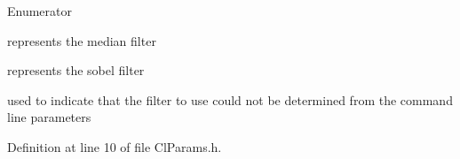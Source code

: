 \begin{Desc}
\item[Enumerator]\par
\begin{description}
\item[{\em 
\hypertarget{namespaceapp_1_1_filter_a2945c335b9c131d8983b181e876d7b00a8ac753cf25baff3e8f119fe1f4efb75b}{}Median\label{namespaceapp_1_1_filter_a2945c335b9c131d8983b181e876d7b00a8ac753cf25baff3e8f119fe1f4efb75b}
}]represents the median filter \item[{\em 
\hypertarget{namespaceapp_1_1_filter_a2945c335b9c131d8983b181e876d7b00a71da1a6fbbd8cc6456e60b3ac0a7dda8}{}Sobel\label{namespaceapp_1_1_filter_a2945c335b9c131d8983b181e876d7b00a71da1a6fbbd8cc6456e60b3ac0a7dda8}
}]represents the sobel filter \item[{\em 
\hypertarget{namespaceapp_1_1_filter_a2945c335b9c131d8983b181e876d7b00a8b153cc7123f87983853b1553d42332e}{}Error\label{namespaceapp_1_1_filter_a2945c335b9c131d8983b181e876d7b00a8b153cc7123f87983853b1553d42332e}
}]used to indicate that the filter to use could not be determined from the command line parameters \end{description}
\end{Desc}


Definition at line 10 of file Cl\+Params.\+h.

